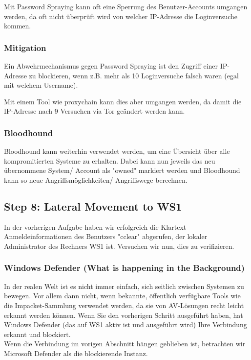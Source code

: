 Mit Password Spraying kann oft eine Sperrung des Benutzer-Accounts umgangen werden, da oft nicht überprüft wird von welcher IP-Adresse die Loginversuche kommen.

\subsubsection{Mitigation}
Ein Abwehrmechanismus gegen Password Spraying ist den Zugriff einer IP-Adresse zu blockieren, wenn z.B. mehr als 10 Loginversuche falsch waren (egal mit welchem Username).

Mit einem Tool wie proxychain kann dies aber umgangen werden, da damit die IP-Adresse nach 9 Versuchen via Tor geändert werden kann.

\subsubsection{Bloodhound}
Bloodhound kann weiterhin verwendet werden, um eine Übersicht über alle kompromitierten Systeme zu erhalten. Dabei kann nun jeweils das neu übernommene System/ Account als "owned" markiert werden und Bloodhound kann so neue Angriffsmöglichkeiten/ Angriffswege berechnen.



\subsection{Step 8: Lateral Movement to WS1}
In der vorherigen Aufgabe haben wir erfolgreich die Klartext-Anmeldeinformationen des Benutzers "cclear" abgerufen, der lokaler Administrator des Rechners WS1 ist. Versuchen wir nun, dies zu verifizieren.

\subsubsection{Windows Defender (What is happening in the Background)}
In der realen Welt ist es nicht immer einfach, sich seitlich zwischen Systemen zu bewegen. Vor allem dann nicht, wenn bekannte, öffentlich verfügbare Tools wie die Impacket-Sammlung verwendet werden, da sie von AV-Lösungen recht leicht erkannt werden können. Wenn Sie den vorherigen Schritt ausgeführt haben, hat Windows Defender (das auf WS1 aktiv ist und ausgeführt wird) Ihre Verbindung erkannt und blockiert.\\

Wenn die Verbindung im vorigen Abschnitt hängen geblieben ist, betrachten wir Microsoft Defender als die blockierende Instanz.


